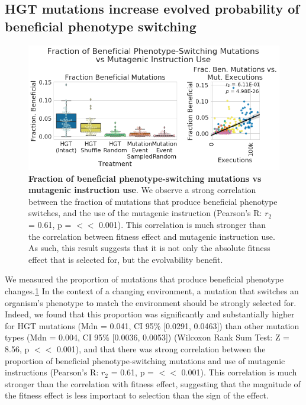 \documentclass[PhD]{msu-thesis}
\begin{document}
\subsection{HGT mutations increase evolved probability of beneficial phenotype switching}
	\begin{figure}[h!]
	\begin{center}
	\includegraphics[width=0.95\columnwidth]{figures/HGT/mutagen_use_vs_fraction_beneficial.png}
	\caption{\textbf{Fraction of beneficial phenotype-switching mutations vs mutagenic instruction use}. We observe a strong correlation between the fraction of mutations that produce beneficial phenotype switches, and the use of the mutagenic instruction (Pearson's R: $r_{2}$ = 0.61, p =  $<<$ 0.001). This correlation is much stronger than the correlation between fitness effect and mutagenic instruction use. As such, this result suggests that it is not only the absolute fitness effect that is selected for, but the evolvability benefit.
	}\label{fig:mutagen_use_vs_fraction_beneficial}
	\end{center}
	\end{figure}

We measured the proportion of mutations that produce beneficial phenotype changes.\ref{fig:mutagen_use_vs_fraction_beneficial} In the context of a changing environment, a mutation that switches an organism's phenotype to match the environment should be strongly selected for. Indeed, we found that this proportion was significantly and substantially higher for HGT mutations (Mdn = 0.041, CI 95\% [0.0291, 0.0463]) than other mutation types (Mdn = 0.004, CI 95\% [0.0036, 0.0053]) (Wilcoxon Rank Sum Test: Z = 8.56, p $<<$ 0.001), and that there was strong correlation between the proportion of beneficial phenotype-switching mutations and use of mutagenic instructions (Pearson's R: $r_{2}$ = 0.61, p =  $<<$ 0.001). This correlation is much stronger than the correlation with fitness effect, suggesting that the magnitude of the fitness effect is less important to selection than the sign of the effect.
\end{document}
